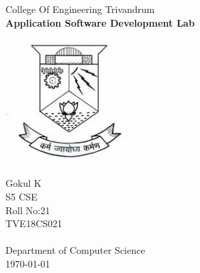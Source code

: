 \documentclass[13pt,oneside]{book}
\begin{document}

\begin{titlepage}
\begin{center}
{\LARGE College Of Engineering Trivandrum}\\[3cm]
\linespread{1.2}\huge {\bfseries Application Software Development Lab}\\[3cm]
\linespread{1}
\includegraphics[width=5cm]{img/emblem.jpeg}\\[3cm]
{\Large Gokul K\\ S5  CSE \\ Roll No:21\\ TVE18CS021 }\\[1cm]


\textit{ }\\[2cm]
Department of Computer Science\\[0.2cm]
\today
\end{center}

\end{titlepage}
\end{document}

